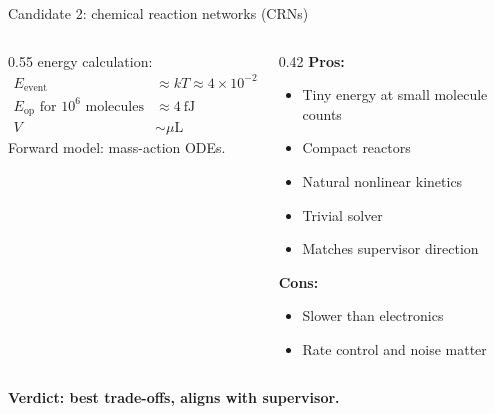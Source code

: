\documentclass[aspectratio=169,11pt]{beamer}
\begin{document}
\begin{frame}{Candidate 2: chemical reaction networks (CRNs)}

\begin{columns}
\begin{column}{0.55\textwidth}
energy calculation:
\begin{align*}
    E_{\text{event}} &\approx kT \approx 4 \times 10^{-21}\ \text{J} \\[0.3em]
    E_{\text{op}} \text{ for } 10^6 \text{ molecules} &\approx 4\ \text{fJ} \\[0.3em]
    V &\sim \mu\text{L}
\end{align*}
Forward model: mass-action ODEs.
\end{column}
\begin{column}{0.42\textwidth}
\textbf{Pros:}
\begin{itemize}
    \item Tiny energy at small molecule counts
    \item Compact reactors
    \item Natural nonlinear kinetics
    \item Trivial solver
    \item Matches supervisor direction
\end{itemize}

\vspace{0.2cm}
\textbf{Cons:}
\begin{itemize}
    \item Slower than electronics
    \item Rate control and noise matter
\end{itemize}
\end{column}
\end{columns}

\vspace{0.4cm}
\centering
\textbf{Verdict: best trade-offs, aligns with supervisor.}

\end{frame}
\end{document}
